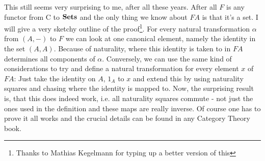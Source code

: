 \documentclass{article}
\begin{document}
This still seems very surprising to me, after all these years.
After all $F$ is any functor from C to ${\bf Sets}$ and the only thing
we know about $FA$ is that it's a set.
I will give a very sketchy outline of the proof\footnote{Thanks to
Mathias Kegelmann for typing up a better version of this}. For every natural
transformation $\alpha$ from $(A,-)$ to $F$ we can look at one canonical
element, namely the identity in the set  $(A,A)$. Because of naturality,
where this identity is taken to in $FA$ determines all components of
$\alpha$. Conversely, we can use the same kind of considerations to try and
define a natural transformation for every element $x$ of $FA$: Just take
the identity on $A$, $ 1_A$ to $x$ and extend this by using naturality squares 
and chasing
where the identity is mapped to. Now, the surprising result is, that
this does indeed work, i.e. all naturality squares commute - not just
the ones used in the definition and these maps are really inverse.
Of course one has to prove it all works
 and the crucial  details can be found in
any Category Theory book.






 




\end{document}
